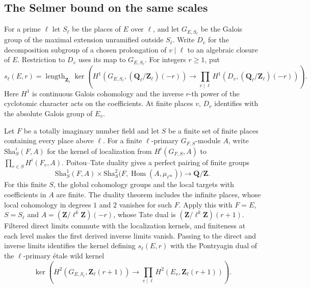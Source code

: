 \subsection{The Selmer bound on the same scales}

For a prime \(\ell\) let \(S_\ell\) be the places of \(E\) over
\(\ell\), and let \(G_{E,S_\ell}\) be the Galois group of the maximal
extension unramified outside \(S_\ell\). Write \(D_v\) for the
decomposition subgroup of a chosen prolongation of \(v\mid\ell\) to
an algebraic closure of \(E\). Restriction to \(D_v\) uses its map
to \(G_{E,S_\ell}\). For integers \(r\ge1\), put
\[
 s_\ell(E,r)=\operatorname{length}_{\mathbf Z_\ell}
  \ker\!\left(H^1(G_{E,S_\ell},(\mathbf Q_\ell/\mathbf Z_\ell)(-r))
     \longrightarrow\prod_{v\mid\ell}
         H^1(D_v,(\mathbf Q_\ell/\mathbf Z_\ell)(-r))\right).
\]
Here \(H^1\) is continuous Galois cohomology and the inverse \(r\)-th
power of the cyclotomic character acts on the coefficients. At finite
places \(v\), \(D_v\) identifies with the absolute Galois group of \(E_v\).

Let \(F\) be a totally imaginary number field and let \(S\) be a
finite set of finite places containing every place above \(\ell\).
For a finite \(\ell\)-primary \(G_{F,S}\)-module \(A\), write
\(\mathrm{Sha}^i_S(F,A)\) for the kernel of localization from
\(H^i(G_{F,S},A)\) to \(\prod_{v\in S}H^i(F_v,A)\).
Poitou--Tate duality gives a perfect pairing of finite groups
\[
 \mathrm{Sha}^1_S(F,A)\times
 \mathrm{Sha}^2_S\bigl(F,\operatorname{Hom}(A,\mu_{\ell^\infty})\bigr)
 \longrightarrow \mathbf Q/\mathbf Z .
\]
For this finite \(S\), the global cohomology groups and the local
targets with coefficients in \(A\) are finite.
The duality theorem includes the infinite places, whose local
cohomology in degrees \(1\) and \(2\) vanishes for such \(F\).
\cite[Theorem~I.4.10(a) and Corollary~I.4.15]{f1milne-adt}
Apply this with \(F=E\), \(S=S_\ell\) and
\(A=(\mathbf Z/\ell^k\mathbf Z)(-r)\), whose Tate dual is
\((\mathbf Z/\ell^k\mathbf Z)(r+1)\). Filtered direct limits commute
with the localization kernels, and finiteness at each level makes
the first derived inverse limits vanish. Passing to the direct and
inverse limits identifies the kernel defining \(s_\ell(E,r)\)
with the Pontryagin dual of the \(\ell\)-primary \'etale wild kernel
\[
 \ker\!\left(H^2(G_{E,S_\ell},\mathbf Z_\ell(r+1))
   \longrightarrow\prod_{v\mid\ell}H^2(E_v,\mathbf Z_\ell(r+1))\right).
\]

